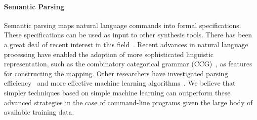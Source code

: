 \paragraph{Semantic Parsing} Semantic parsing maps natural language commands into formal specifications. These specifications can be used as input to other synthesis tools. There has been a great deal of recent interest in this field~\cite{mihalcea2006nlp,LandhauBer:2015:TUP:2820668.2820671,Zettlemoyer05learningto,artzi2013weakly,DBLP:Poon13,Kwiatkowski:2011:LGC:2145432.2145593,liang2013learning}. Recent advances in natural language processing have enabled the adoption of more sophisticated linguistic representation, such as the combinatory categorical grammar (CCG)~\cite{opac-b1080082}, as features for constructing the mapping. Other researchers have investigated parsing efficiency~\cite{lewis2015joint} and more effective machine learning algorithms~\cite{DBLP:journals/corr/ZarembaS14}. We believe that simpler techniques based on simple machine learning can outperform these advanced strategies in the case of command-line programs given the large body of available training data.
